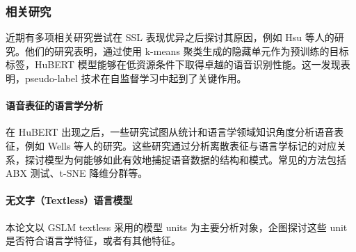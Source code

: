 \subsubsection{相关研究}

近期有多项相关研究尝试在 SSL 表现优异之后探讨其原因，例如 Hsu 等人的研究。他们的研究表明，通过使用 k-means 聚类生成的隐藏单元作为预训练的目标标签，HuBERT 模型能够在低资源条件下取得卓越的语音识别性能。这一发现表明，pseudo-label 技术在自监督学习中起到了关键作用。

\paragraph{语音表征的语言学分析}

在 HuBERT 出现之后，一些研究试图从统计和语言学领域知识角度分析语音表征，例如 Wells 等人的研究。这些研究通过分析离散表征与语言学标记的对应关系，探讨模型为何能够如此有效地捕捉语音数据的结构和模式。常见的方法包括 ABX 测试、t-SNE 降维分群等。

\paragraph{无文字（Textless）语言模型}

本论文以 GSLM textless 采用的模型 units 为主要分析对象，企图探讨这些 unit 是否符合语言学特征，或者有其他特征。

 